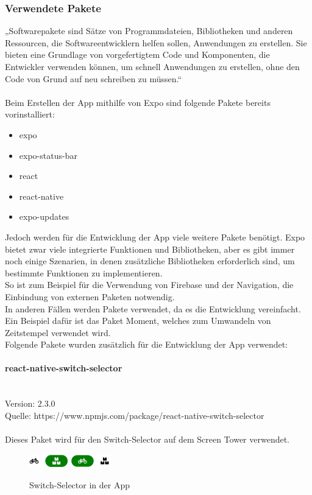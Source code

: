 \subsubsection{Verwendete Pakete}
„Softwarepakete sind Sätze von Programmdateien, Bibliotheken und anderen Ressourcen, die Softwareentwicklern helfen sollen, Anwendungen zu erstellen. Sie bieten eine Grundlage von vorgefertigtem Code und Komponenten, die Entwickler verwenden können, um schnell Anwendungen zu erstellen, ohne den Code von Grund auf neu schreiben zu müssen.“\cite{pakete} \\ \\
Beim Erstellen der App mithilfe von Expo sind folgende Pakete bereits vorinstalliert:\\
\begin{itemize}
    \item expo
    \item expo-status-bar
    \item react
    \item react-native
    \item expo-updates
\end{itemize}
Jedoch werden für die Entwicklung der App viele weitere Pakete benötigt. Expo bietet zwar viele integrierte Funktionen und Bibliotheken, aber es gibt immer noch einige Szenarien, in denen zusätzliche Bibliotheken erforderlich sind, um bestimmte Funktionen zu implementieren.\\
So ist zum Beispiel für die Verwendung von Firebase und der Navigation, die Einbindung von externen Paketen notwendig.\\
In anderen Fällen werden Pakete verwendet, da es die Entwicklung vereinfacht. Ein Beispiel dafür ist das Paket Moment, welches zum Umwandeln von Zeitstempel verwendet wird.\\
Folgende Pakete wurden zusätzlich für die Entwicklung der App verwendet:\\


\paragraph{react-native-switch-selector}\mbox{}\\
Version: 2.3.0\\ Quelle: https://www.npmjs.com/package/react-native-switch-selector\\ \\
Dieses Paket wird für den Switch-Selector auf dem Screen Tower verwendet. \\  
\begin{figure}[H]
    \centering
    \includegraphics[width=0.15\textwidth]{images/app-screenshots/switchselector.png}
    \includegraphics[width=0.15\textwidth]{images/app-screenshots/switchselector2.png}
    \caption{Switch-Selector in der App}
    \label{fig:switchselector}
\end{figure}

